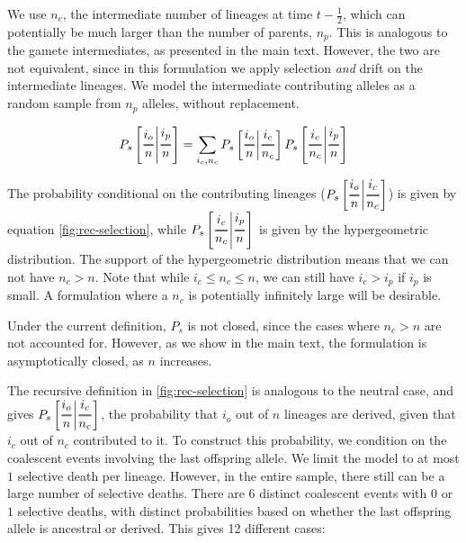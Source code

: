 \documentclass[review]{elsarticle}
\newcommand{\Dfrac}[2]{%
  \ooalign{%
    $\genfrac{}{}{1.2pt}0{#1}{#2}$\cr%
    $\color{white}\genfrac{}{}{.4pt}0{\phantom{#1}}{\phantom{#2}}$}%
}
\newcommand{\cond}{\middle\vert}
\begin{document}
We use $n_c$, the intermediate number of lineages at time $t-\frac{1}{2}$, which can
potentially be much larger than the number of parents, $n_p$. This is analogous to the gamete
intermediates, as presented in the main text. However, the two are not equivalent, since in this
formulation we apply selection \emph{and} drift on the intermediate lineages. We model the
intermediate contributing alleles as a random sample from $n_p$ alleles, without replacement.

\begin{equation}
  P_s\left[ \Dfrac{i_o}{n} \cond \Dfrac{i_p}{n} \right] = \sum_{i_c,n_c}P_s\left[ \Dfrac{i_o}{n}
    \cond \Dfrac{i_c}{n_c} \right] P_s\left[ \Dfrac{i_c}{n_c} \cond \Dfrac{i_p}{n} \right]
\end{equation}

The probability conditional on the contributing lineages
($P_s\left[ \Dfrac{i_o}{n} \cond \Dfrac{i_c}{n_c} \right]$) is given by equation
\ref{fig:rec-selection}, while $P_s\left[ \Dfrac{i_c}{n_c} \cond \Dfrac{i_p}{n} \right]$ is given by
the hypergeometric distribution. The support of the hypergeometric distribution means that we can
not have $n_c>n$. Note that while $i_c \le n_c \le n$, we can still have $i_c>i_p$ if $i_p$ is
small. A formulation where a $n_c$ is potentially infinitely large will be desirable.

Under the current definition, $P_s$ is not closed, since the cases where $n_c>n$ are not accounted
for. However, as we show in the main text, the formulation is asymptotically closed, as $n$ increases.

The recursive definition in \ref{fig:rec-selection} is analogous to the neutral case, and gives
$P_s\left[ \Dfrac{i_o}{n} \cond \Dfrac{i_c}{n_c} \right]$, the probability that $i_o$ out of $n$
lineages are derived, given that $i_c$ out of $n_c$ contributed to it. To construct this
probability, we condition on the coalescent events involving the last offspring allele. We limit the
model to at most $1$ selective death per lineage. However, in the entire sample, there still can be
a large number of selective deaths. There are 6 distinct coalescent events with $0$ or $1$ selective
deaths, with distinct probabilities based on whether the last offspring allele is ancestral or
derived. This gives 12 different cases:
\end{document}
